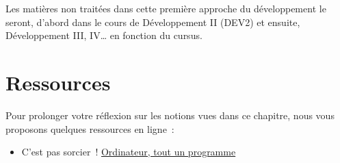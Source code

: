 		Les matières non traitées dans cette première approche du développement 
		le seront, d'abord dans le cours de Développement II (DEV2) et ensuite,
		Développement III, IV… en fonction du cursus. 

	\section{Ressources}
	
		Pour prolonger votre réflexion 
		sur les notions vues dans ce chapitre, 
		nous vous proposons quelques ressources en ligne~:
		\begin{itemize}
		\item
			C'est pas sorcier~! 
			\href{https://www.youtube.com/watch?v=c96KP5jZVYk}
			{Ordinateur, tout un programme}
		\end{itemize}
